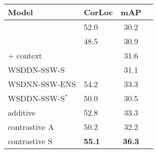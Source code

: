 \begin{center}
\begin{tabular}{llcc}
\toprule
Model &  CorLoc & mAP \\
\midrule
\cite{Cinbis:2015wn}  &52.0&30.2\\
\cite{Wang:2014tg} & 48.5 & 30.9 \\
\cite{Wang:2014tg} + context &&31.6\\
WSDDN-SSW-S \cite{Bilen:2015uo}&      & 31.1       \\
WSDNN-SSW-ENS \cite{Bilen:2015uo} & 54.2 & 33.3\\
\midrule
WSDDN-SSW-S$^*$& 50.0      & 30.5       \\
additive & 52.8      & 33.3       \\
contrastive A & 50.2      & 32.2       \\
contrastive S & \textbf{55.1}      & \textbf{36.3}       \\



\bottomrule
\end{tabular}
\end{center}
